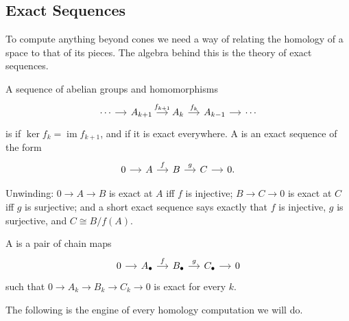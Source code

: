 \documentclass[a4paper]{scrartcl}
\begin{document}
\subsection{Exact Sequences}

To compute anything beyond cones we need a way of relating the homology of a space to
that of its pieces. The algebra behind this is the theory of exact sequences.

\begin{definition}
	A sequence of abelian groups and homomorphisms
	\[\begin{tikzcd}[column sep=small]
		\cdots \arrow[r] & {A_{k+1}} \arrow[r, "{f_{k+1}}"] & {A_k} \arrow[r, "{f_k}"] & {A_{k-1}} \arrow[r] & \cdots
	\end{tikzcd}\]
	is  if $\ker f_k = \operatorname{im}f_{k+1}$, and  if it is exact everywhere. A  is an exact sequence of the form
	\[\begin{tikzcd}[column sep=small]
		0 \arrow[r] & A \arrow[r, "f"] & B \arrow[r, "g"] & C \arrow[r] & 0 .
	\end{tikzcd}\]
\end{definition}

Unwinding: $0 \to A \to B$ is exact at $A$ iff $f$ is injective; $B \to C \to 0$ is exact
at $C$ iff $g$ is surjective; and a short exact sequence says exactly that $f$ is
injective, $g$ is surjective, and $C \cong B/f(A)$.

\begin{definition}
	A  is a pair of chain maps
	\[\begin{tikzcd}[column sep=small]
		0 \arrow[r] & {A_\bullet} \arrow[r, "f"] & {B_\bullet} \arrow[r, "g"] & {C_\bullet} \arrow[r] & 0
	\end{tikzcd}\]
	such that $0 \to A_k \to B_k \to C_k \to 0$ is exact for every $k$.
\end{definition}

The following is the engine of every homology computation we will do.
\end{document}

